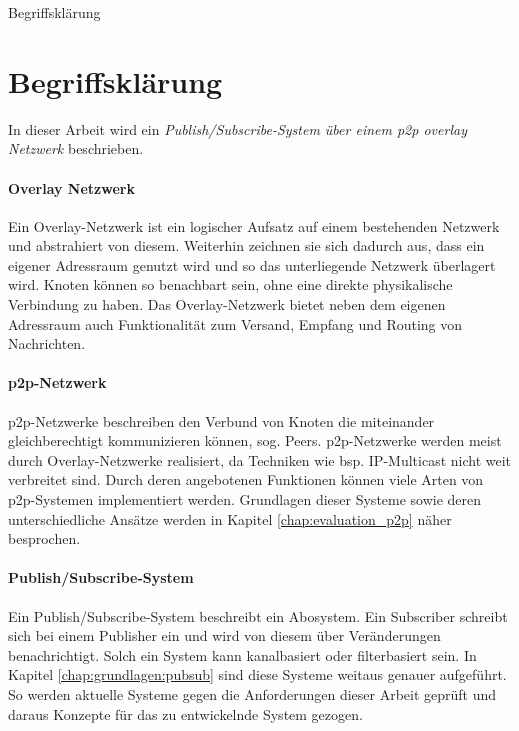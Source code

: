 Begriffsklärung


\section{Begriffsklärung}
In dieser Arbeit wird ein \emph{Publish/Subscribe-System über einem \ac{p2p} overlay Netzwerk} beschrieben.

\paragraph{Overlay Netzwerk} Ein Overlay-Netzwerk ist ein logischer Aufsatz auf einem bestehenden Netzwerk und abstrahiert von diesem. Weiterhin zeichnen sie sich dadurch aus, dass ein eigener Adressraum genutzt wird und so das unterliegende Netzwerk überlagert wird. Knoten können so benachbart sein, ohne eine direkte physikalische Verbindung zu haben. Das Overlay-Netzwerk bietet neben dem eigenen Adressraum auch Funktionalität zum Versand, Empfang und Routing von Nachrichten.


\paragraph{\ac{p2p}-Netzwerk} p2p-Netzwerke beschreiben den Verbund von Knoten die miteinander gleichberechtigt kommunizieren können, sog. Peers. p2p-Netzwerke werden meist durch Overlay-Netzwerke realisiert, da Techniken wie bsp. IP-Multicast nicht weit verbreitet sind. Durch deren angebotenen Funktionen können viele Arten von p2p-Systemen implementiert werden. Grundlagen dieser Systeme sowie deren unterschiedliche Ansätze werden in Kapitel \ref{chap:evaluation_p2p} näher besprochen.


\paragraph{Publish/Subscribe-System} Ein Publish/Subscribe-System beschreibt ein Abosystem. Ein Subscriber schreibt sich bei einem Publisher ein und wird von diesem über Veränderungen benachrichtigt. Solch ein System kann kanalbasiert oder filterbasiert sein. In Kapitel \ref{chap:grundlagen:pubsub} sind diese Systeme weitaus genauer aufgeführt. So werden aktuelle Systeme gegen die Anforderungen dieser Arbeit geprüft und daraus Konzepte für das zu entwickelnde System gezogen.

